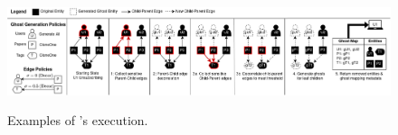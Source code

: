 \begin{figure}[t!]
    \includegraphics[width=.5\textwidth]{img/algo}
    \label{fig:algo}
    \caption{Examples of \sys's execution.}
\end{figure}

%

